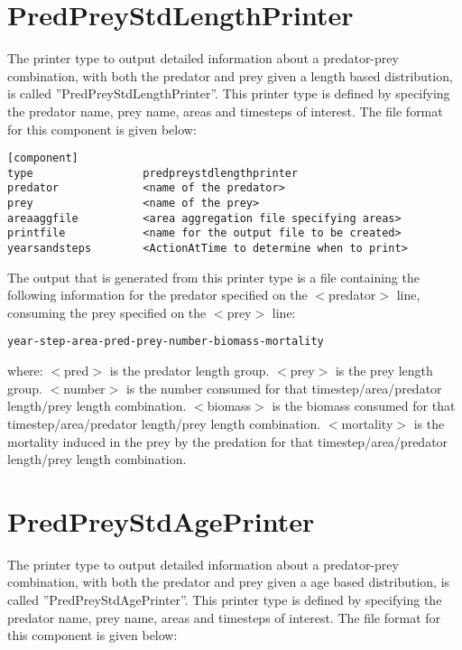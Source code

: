 \documentclass [a4paper, 10pt]{book}
\begin{document}
\section{PredPreyStdLengthPrinter}\label{sec:predpreystdlengthprinter}
The printer type to output detailed information about a predator-prey combination, with both the predator and prey given a length based distribution, is called ''PredPreyStdLengthPrinter''.  This printer type is defined by specifying the predator name, prey name, areas and timesteps of interest.  The file format for this component is given below:

{\small\begin{verbatim}
[component]
type                 predpreystdlengthprinter
predator             <name of the predator>
prey                 <name of the prey>
areaaggfile          <area aggregation file specifying areas>
printfile            <name for the output file to be created>
yearsandsteps        <ActionAtTime to determine when to print>
\end{verbatim}}

The output that is generated from this printer type is a file containing the following information for the predator specified on the $<$predator$>$ line, consuming the prey specified on the $<$prey$>$ line:

{\small\begin{verbatim}
year-step-area-pred-prey-number-biomass-mortality
\end{verbatim}}

where:\newline
$<$pred$>$ is the predator length group.\newline
$<$prey$>$ is the prey length group.\newline
$<$number$>$ is the number consumed for that timestep/area/predator length/prey length combination.\newline
$<$biomass$>$ is the biomass consumed for that timestep/area/predator length/prey length combination.\newline
$<$mortality$>$ is the mortality induced in the prey by the predation for that timestep/area/predator length/prey length combination.

\section{PredPreyStdAgePrinter}\label{sec:predpreystdageprinter}
The printer type to output detailed information about a predator-prey combination, with both the predator and prey given a age based distribution, is called ''PredPreyStdAgePrinter''.  This printer type is defined by specifying the predator name, prey name, areas and timesteps of interest.  The file format for this component is given below:
\end{document}

